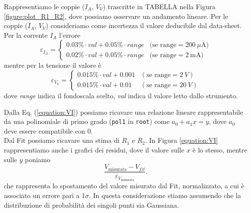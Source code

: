 \documentclass[italian, a4paper, 10pt, twocolumn]{../../style/lab_unige}
\newcommand{\reffig}[1]{Figura {\ref{#1}}}%
\newcommand{\refeqn}[1]{Eq. ({\ref{#1}})}%
\newcommand{\cernroot}{\texttt{root}}
\newcommand{\mstdErr}[1]{\varepsilon_{#1}}
\begin{document}
    Rappresentiamo le coppie ($I_A$, $V_V$) trascritte in TABELLA nella \reffig{figure:plot_R1_R2}, dove possiamo osservare un andamento lineare. Per le coppie ($I_A$, $V_V$) consideriamo come incertezza il valore deducibile dal data-sheet.\\
    Per la corrente $I_A$ l'errore 
    \[
        \mstdErr{I_A} =
            \begin{cases}
                0.03\%\cdot val + 0.05\%\cdot range & \text{(se range}=200~\mu\text{A)}\\
                0.02\%\cdot val + 0.05\%\cdot range & \text{(se range}=2~\text{mA)}
            \end{cases}
    \]
    mentre per la tensione il valore è
    \[
        \mstdErr{V_V} =
            \begin{cases}
                0.015\%\cdot val+0.001 & (\text{se range}=2~V)\\
                0.015\%\cdot val+0.01 & (\text{se range}=20~V)
            \end{cases}
    \]
    dove \textit{range} indica il fondoscala scelto, \textit{val} indica il valore letto dallo strumento.

    Dalla \refeqn{equation:VI} possiamo ricavare una relazione lineare rappresentabile da una polinomiale di primo grado (\verb|pol1| in \cernroot) come $a_0 + a_1x = y$, dove $a_0$ deve essere compatibile con 0.\\
    Dal Fit possiamo ricavare una stima di $R_1$ e $R_2$. In \reffig{equation:VI} rappresentiamo anche i grafici dei residui, dove il valore sulle $x$ è lo stesso, mentre sulle $y$ poniamo
    \[
        \frac{V_{\text{misurata}}-V_{fit}}{\mstdErr{V_{\text{misurata}}}}.
    \]
    che rappresenta lo spostamento del valore misurato dal Fit, normalizzato, a cui è associato un errore pari a $1\sigma$. In questa considerazione stiamo assumendo che la distribuzione di probabilità dei singoli punti sia Gaussiana.
\end{document}
